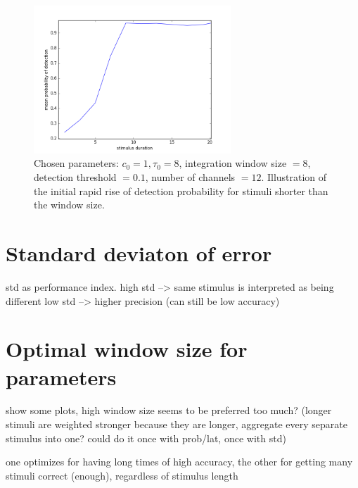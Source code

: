\documentclass{scrartcl}
\begin{document}
\begin{figure}
\centering
\includegraphics[width=0.66\textwidth, clip]{../pics/t4/prob_of_dur_1_8_8_01_section}
\caption{Chosen parameters: $c_0 = 1, \tau_0 = 8$, integration window size $=8$, detection threshold $=0.1$, number of channels $=12$. Illustration of the initial rapid rise of detection probability for stimuli shorter than the window size. }
\label{sect}
\end{figure}

\section{Standard deviaton of error}

std as performance index.
high std --> same stimulus is interpreted as being different
low std --> higher precision (can still be low accuracy)

\section{Optimal window size for parameters}

show some plots, high window size seems to be preferred too much? (longer stimuli are weighted stronger because they are longer, aggregate every separate stimulus into one? could do it once with prob/lat, once with std)

one optimizes for having long times of high accuracy, the other for getting many stimuli correct (enough), regardless of stimulus length
\end{document}

